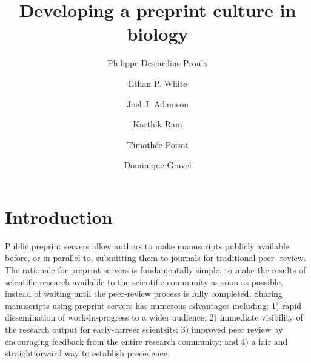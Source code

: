 \documentclass[letterpaper,twocolumn,superscriptaddress,showkeys,longbibliography]{revtex4-1}
\begin{document}
\title{Developing a preprint culture in biology}

\author{Philippe Desjardins-Proulx}

\author{Ethan P. White}

\author{Joel J. Adamson}

\author{Karthik Ram}

\author{Timoth\'ee Poisot}

\author{Dominique Gravel}


\maketitle

\section{Introduction}

Public preprint servers allow authors to make manuscripts publicly available
before, or in parallel to, submitting them to journals for traditional peer-
review. The rationale for preprint servers is fundamentally simple: to make
the results of scientific research available to the scientific community as
soon as possible, instead of waiting until the peer-review process is fully
completed.  Sharing manuscripts using preprint servers has numerous advantages
including: 1) rapid dissemination of work-in-progress to a wider audience; 2)
immediate visibility of the research output for early-carreer scientsits; 3)
improved peer review by encouraging feedback from the entire research
community; and 4) a fair and straightforward way to establish precedence.
\end{document}
